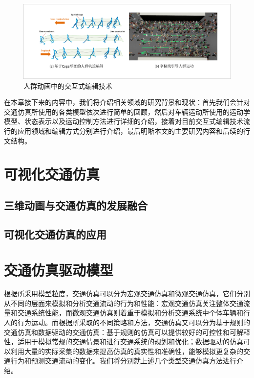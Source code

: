 \begin{figure}[!tbh]
\centering
\includegraphics[width=\textwidth]{figure/intro/crowd interactive v2.pdf}
\caption[人群动画中的交互式编辑技术]{
人群动画中的交互式编辑技术
}
\label{fig:intro_intercrowd}
\end{figure}

在本章接下来的内容中，我们将介绍相关领域的研究背景和现状：首先我们会针对交通仿真所使用的各类模型依次进行简单的回顾，然后对车辆运动所使用的运动学模型、状态表示以及运动控制方法进行详细的介绍，接着对目前交互式编辑技术流行的应用领域和编辑方式分别进行介绍，最后明晰本文的主要研究内容和后续的行文结构。


\section{可视化交通仿真}

\subsection{三维动画与交通仿真的发展融合}



\subsection{可视化交通仿真的应用}




\section{交通仿真驱动模型}

根据所采用模型粒度，交通仿真可以分为宏观交通仿真和微观交通仿真，它们分别从不同的层面来模拟和分析交通流动的行为和性能：宏观交通仿真关注整体交通流量和交通系统性能，而微观交通仿真则着重于模拟和分析交通系统中个体车辆和行人的行为运动。而根据所采取的不同策略和方法，交通仿真又可以分为基于规则的交通仿真和数据驱动的交通仿真：基于规则的仿真可以提供较好的可控性和可解释性，适用于模拟常规的交通情景和进行交通系统的规划和优化；数据驱动的仿真可以利用大量的实际采集的数据来提高仿真的真实性和准确性，能够模拟更复杂的交通行为和预测交通流动的变化。我们将分别就上述几个类型交通仿真方法进行介绍。



